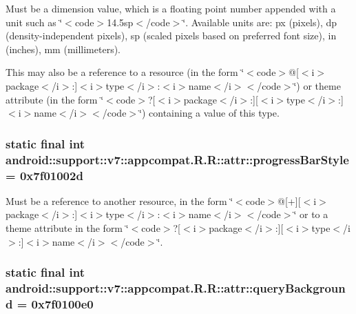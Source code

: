 Must be a dimension value, which is a floating point number appended with a unit such as \char`\"{}$<$code$>$14.5sp$<$/code$>$\char`\"{}. Available units are: px (pixels), dp (density-independent pixels), sp (scaled pixels based on preferred font size), in (inches), mm (millimeters). 

This may also be a reference to a resource (in the form \char`\"{}$<$code$>$@\mbox{[}$<$i$>$package$<$/i$>$:\mbox{]}$<$i$>$type$<$/i$>$:$<$i$>$name$<$/i$>$$<$/code$>$\char`\"{}) or theme attribute (in the form \char`\"{}$<$code$>$?\mbox{[}$<$i$>$package$<$/i$>$:\mbox{]}\mbox{[}$<$i$>$type$<$/i$>$:\mbox{]}$<$i$>$name$<$/i$>$$<$/code$>$\char`\"{}) containing a value of this type. \hypertarget{classandroid_1_1support_1_1v7_1_1appcompat_1_1_r_1_1attr_0272415e182e9343da48fa398b59f0db}{
\subsubsection[{progressBarStyle}]{\setlength{\rightskip}{0pt plus 5cm}static final int android::support::v7::appcompat.R.R::attr::progressBarStyle = 0x7f01002d}}
\label{classandroid_1_1support_1_1v7_1_1appcompat_1_1_r_1_1attr_0272415e182e9343da48fa398b59f0db}


Must be a reference to another resource, in the form \char`\"{}$<$code$>$@\mbox{[}+\mbox{]}\mbox{[}$<$i$>$package$<$/i$>$:\mbox{]}$<$i$>$type$<$/i$>$:$<$i$>$name$<$/i$>$$<$/code$>$\char`\"{} or to a theme attribute in the form \char`\"{}$<$code$>$?\mbox{[}$<$i$>$package$<$/i$>$:\mbox{]}\mbox{[}$<$i$>$type$<$/i$>$:\mbox{]}$<$i$>$name$<$/i$>$$<$/code$>$\char`\"{}. \hypertarget{classandroid_1_1support_1_1v7_1_1appcompat_1_1_r_1_1attr_534f2a4d46ae28dcf3a55b295dfb927c}{
\subsubsection[{queryBackground}]{\setlength{\rightskip}{0pt plus 5cm}static final int android::support::v7::appcompat.R.R::attr::queryBackground = 0x7f0100e0}}
\label{classandroid_1_1support_1_1v7_1_1appcompat_1_1_r_1_1attr_534f2a4d46ae28dcf3a55b295dfb927c}



